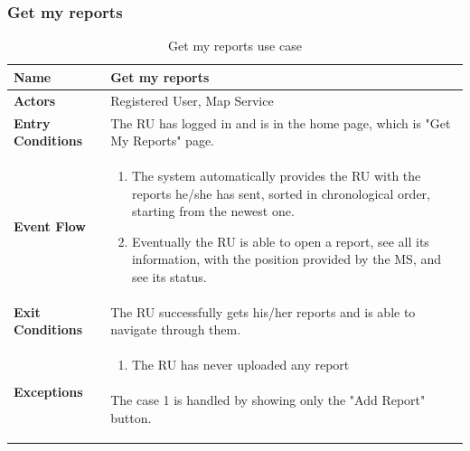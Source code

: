					\subsubsection{Get my reports}
					\begin{table}[!h]
						\centering
						\vspace{-4mm}
						\begin{tabular}{lp{}}
							\toprule
							\textbf{Name} & \textbf{Get my reports} \\[1mm]
							\midrule
							\textbf{Actors} & Registered User, Map Service \\[1mm]
							\textbf{Entry Conditions} & The RU has logged in and is in the home page, which is "Get My Reports" page. \vspace{1mm}\\
							\textbf{Event Flow} &
							\vspace{-5mm} 
							\begin{enumerate}
								\setlength\itemsep{0.2mm}
								\item The system automatically provides the RU with the reports he/she has sent, sorted in chronological order, starting from the newest one.
								\item Eventually the RU is able to open a report, see all its information, with the position provided by the MS, and see its status.
							\end{enumerate} \\
							\textbf{Exit Conditions} & The RU successfully gets his/her reports and is able to navigate through them. \vspace{2mm}\\
							\textbf{Exceptions} &
							\vspace{-5mm} 
							\begin{enumerate}
								\item The RU has never uploaded any report
							\end{enumerate}
							\vspace{-7mm}
							\paragraph{}
								The case 1 is handled by showing only the "Add Report" button. \\
							\bottomrule
						\end{tabular}
						\caption{Get my reports use case}
					\end{table}
